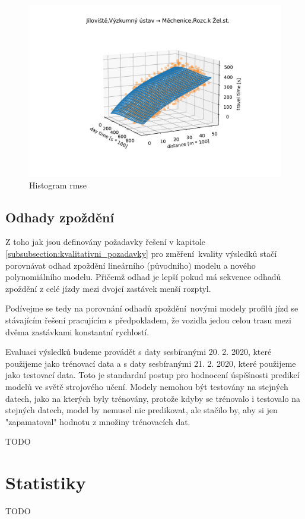 \begin{figure}
	\centering
  \includegraphics[width=1\linewidth]{../img/thrd_degree}
  \caption{Histogram \gls{rmse}}
  \label{fig:thrd_degree}
\end{figure}


\subsection{Odhady zpoždění} \label{subsection:odhady_zpozdeni}

Z toho jak jsou definovány požadavky řešení v kapitole \ref{subsubsection:kvalitativni_pozadavky} pro změření kvality výsledků stačí porovnávat odhad zpoždění lineárního (původního) modelu a nového polynomiálního modelu. Přičemž odhad je lepší pokud má sekvence odhadů zpoždění z celé jízdy mezi dvojcí zastávek menší rozptyl.

\bigbreak

Podívejme se tedy na porovnání odhadů zpoždění novými modely profilů jízd se stávajícím řešení pracujícím s předpokladem, že vozidla jedou celou trasu mezi dvěma zastávkami konstantní rychlostí.

\bigbreak

Evaluaci výsledků budeme provádět s daty sesbíranými 20. 2. 2020, které použijeme jako trénovací data a s daty sesbíranými 21. 2. 2020, které použijeme jako testovací data. Toto je standardní postup pro hodnocení úspěšnosti predikcí modelů ve světě strojového učení. Modely nemohou být testovány na stejných datech, jako na kterých byly trénovány, protože kdyby se trénovalo i testovalo na stejných datech, model by nemusel nic predikovat, ale stačilo by, aby si jen "zapamatoval" hodnotu z množiny trénovacích dat.

\bigbreak

TODO

\section{Statistiky}

TODO
